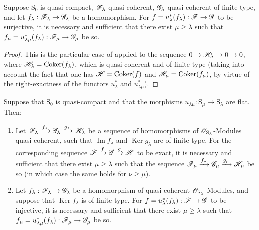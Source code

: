 \begin{corollary}[8.5.7]
\label{IV.8.5.7}
Suppose $\mathrm{S}_0$ is quasi-compact, $\mathscr{F}_\lambda$ quasi-coherent, $\mathscr{G}_\lambda$ quasi-coherent of finite type, and let $f_\lambda:\mathscr{F}_\lambda\to\mathscr{G}_\lambda$ be a homomorphism.
For $f=u_\lambda^*(f_\lambda):\mathscr{F}\to\mathscr{G}$ to be surjective, it is necessary and sufficient that there exist $\mu\geqslant\lambda$ such that $f_\mu=u_{\lambda\mu}^*(f_\lambda):\mathscr{F}_\mu\to\mathscr{G}_\mu$ be so.
\end{corollary}

\begin{proof}
This is the particular case of  applied to the sequence $0\to\mathscr{H}_\lambda\to 0\to 0$, where $\mathscr{H}_\lambda=\operatorname{Coker}(f_\lambda)$, which is quasi-coherent and of finite type (taking into account the fact that one has $\mathscr{H}=\operatorname{Coker}(f)$ and $\mathscr{H}_\mu=\operatorname{Coker}(f_\mu)$, by virtue of the right-exactness of the functors $u_\lambda^*$ and $u_{\lambda\mu}^*$).
\end{proof}

\begin{corollary}[8.5.8]
\label{IV.8.5.8}
Suppose that $\mathrm{S}_0$ is quasi-compact and that the morphisms $u_{\lambda\mu}:\mathrm{S}_\mu\to\mathrm{S}_\lambda$ are \textup{flat}.
Then:
\begin{enumerate}[label=\textup{(\roman*)}]
  \item Let $\mathscr{F}_\lambda\xrightarrow{f_\lambda}\mathscr{G}_\lambda\xrightarrow{g_\lambda}\mathscr{H}_\lambda$ be a sequence of homomorphisms of $\mathscr{O}_{\mathrm{S}_\lambda}$-Modules quasi-coherent, such that $\operatorname{Im} f_\lambda$ and $\operatorname{Ker} g_\lambda$ are of finite type.
For the corresponding sequence $\mathscr{F}\xrightarrow{f}\mathscr{G}\xrightarrow{g}\mathscr{H}$ to be
exact, it is necessary and sufficient that there exist $\mu\geqslant\lambda$ such that the sequence $\mathscr{F}_\mu\xrightarrow{f_\mu}\mathscr{G}_\mu\xrightarrow{g_\mu}\mathscr{H}_\mu$ be so (in which case the same holds for $\nu\geqslant\mu$).
  \item Let $f_\lambda:\mathscr{F}_\lambda\to\mathscr{G}_\lambda$ be a homomorphism of quasi-coherent $\mathscr{O}_{\mathrm{S}_\lambda}$-Modules, and suppose that $\operatorname{Ker} f_\lambda$ is of finite type.
For $f=u_\lambda^*(f_\lambda):\mathscr{F}\to\mathscr{G}$ to be injective, it is necessary and sufficient that there exist $\mu\geqslant\lambda$ such that $f_\mu=u_{\lambda\mu}^*(f_\lambda):\mathscr{F}_\mu\to\mathscr{G}_\mu$ be so.
\end{enumerate}
\end{corollary}

